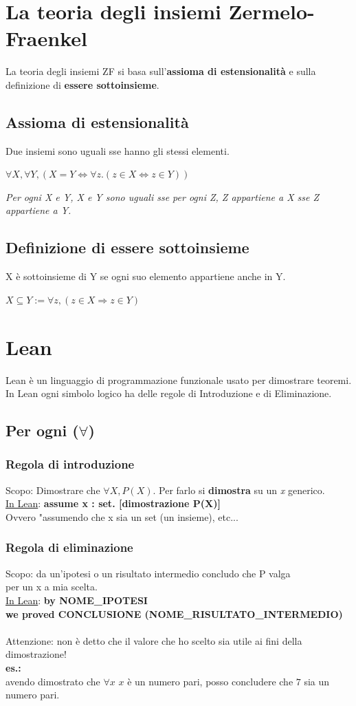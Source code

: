 \documentclass[12pt]{article}
\begin{document}
\section{La teoria degli insiemi Zermelo-Fraenkel}
La teoria degli insiemi ZF si basa sull'\textbf{assioma di estensionalità} e sulla definizione di \textbf{essere sottoinsieme}.
\subsection{Assioma di estensionalità}
Due insiemi sono uguali sse hanno gli stessi elementi.
\begin{center}
    $\forall X, \forall Y, (X = Y \Leftrightarrow \forall z. (z \in X \Leftrightarrow z \in Y))$
\end{center}
\textit{Per ogni X e Y, X e Y sono uguali sse per ogni Z, Z appartiene a X sse Z appartiene a Y.}
\subsection{Definizione di essere sottoinsieme}
X è sottoinsieme di Y se ogni suo elemento appartiene anche in Y.
\begin{center}
    $X \subseteq Y := \forall z, (z \in X \Rightarrow z \in Y) $
\end{center}
\pagebreak
\section{Lean}
Lean è un linguaggio di programmazione funzionale usato per dimostrare teoremi.\\
In Lean ogni simbolo logico ha delle regole di Introduzione e di Eliminazione.
\subsection{Per ogni ($\forall$)}
\subsubsection{Regola di introduzione}
Scopo: Dimostrare che $\forall X,  P(X)$. Per farlo si \textbf{dimostra} su un \textit{x} generico.\\
\underline{In Lean}: \textbf{assume x : set. [dimostrazione P(X)]}\\
Ovvero "assumendo che x sia un set (un insieme), etc...
\subsubsection{Regola di eliminazione}
Scopo: da un'ipotesi o un risultato intermedio concludo che P valga\\
per un x a mia scelta.\\
\underline{In Lean}: \textbf{by NOME\_IPOTESI \\
we proved CONCLUSIONE (NOME\_RISULTATO\_INTERMEDIO)}\\\\
Attenzione: non è detto che il valore che ho scelto sia utile ai fini della dimostrazione!\\
\textbf{es.:}\\
avendo dimostrato che $\forall x$ $x$ è un numero pari, posso concludere che $7$ sia un numero pari.
\pagebreak
\end{document}
